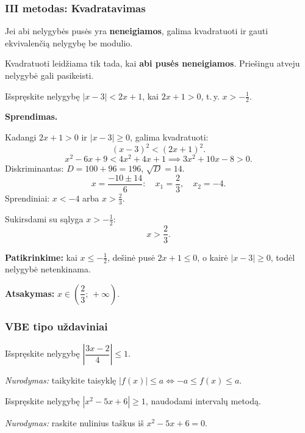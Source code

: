 \subsubsection*{III metodas: Kvadratavimas}

Jei abi nelygybės pusės yra \textbf{neneigiamos}, galima kvadratuoti ir gauti ekvivalenčią nelygybę be modulio.

\begin{tcolorbox}[colback=red!5, colframe=red!60, title=Svarbu!]
Kvadratuoti leidžiama tik tada, kai \textbf{abi pusės neneigiamos}. Priešingu atveju nelygybė gali pasikeisti.
\end{tcolorbox}

\begin{example}
Išspręskite nelygybę $|x - 3| < 2x + 1$, kai $2x + 1 > 0$, t.\,y. $x > -\tfrac{1}{2}$.

\textbf{Sprendimas.}

Kadangi $2x + 1 > 0$ ir $|x-3| \geq 0$, galima kvadratuoti:
\[
(x-3)^2 < (2x+1)^2.
\]
\[
x^2 - 6x + 9 < 4x^2 + 4x + 1 \implies 3x^2 + 10x - 8 > 0.
\]
Diskriminantas: $D = 100 + 96 = 196$, $\sqrt{D} = 14$.
\[
x = \frac{-10 \pm 14}{6}: \quad x_1 = \frac{2}{3}, \quad x_2 = -4.
\]
Sprendiniai: $x < -4$ arba $x > \tfrac{2}{3}$.

Sukirsdami su sąlyga $x > -\tfrac{1}{2}$:
\[
x > \frac{2}{3}.
\]

\textbf{Patikrinkime:} kai $x \leq -\tfrac{1}{2}$, dešinė pusė $2x+1 \leq 0$, o kairė $|x-3| \geq 0$, todėl nelygybė netenkinama.

\textbf{Atsakymas:} $x \in \left(\dfrac{2}{3};\, +\infty\right)$.
\end{example}

\subsubsection*{VBE tipo uždaviniai}

\begin{exercise}
Išspręskite nelygybę $\left|\dfrac{3x-2}{4}\right| \leq 1$.

\textit{Nurodymas:} taikykite taisyklę $|f(x)| \leq a \iff -a \leq f(x) \leq a$.
\end{exercise}

\begin{exercise}
Išspręskite nelygybę $|x^2 - 5x + 6| \geq 1$, naudodami intervalų metodą.

\textit{Nurodymas:} raskite nulinius taškus iš $x^2 - 5x + 6 = 0$.
\end{exercise}

